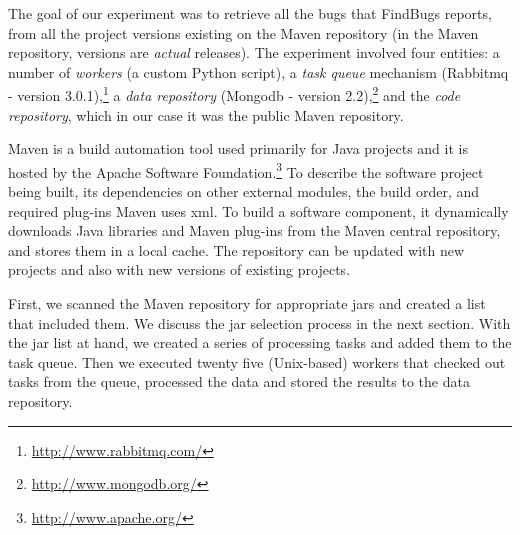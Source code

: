 \documentclass{sig-alternate}
\begin{document}
The goal of our experiment was to retrieve all the bugs that FindBugs reports,
from all the project versions existing on the Maven repository (in the Maven
repository, versions are {\it actual} releases). The experiment involved four entities:
a number of {\it workers} (a custom Python script), a {\it task queue}
mechanism (Rabbit{\sc mq} - version 3.0.1),\footnote{\url{http://www.rabbitmq.com/}}
a {\it data repository} (Mongo{\sc db} - version 2.2),\footnote{\url{http://www.mongodb.org/}}
and the {\it code repository}, which in our case it was
the public Maven repository.


Maven is a build automation tool used primarily for Java projects and it is
hosted by the Apache Software Foundation.\footnote{\url{http://www.apache.org/}}
To describe the software project being built, its dependencies
on other external modules, the build order, and required plug-ins Maven uses
{\sc xml}. To build a software component, it dynamically downloads Java libraries
and Maven plug-ins from the Maven central repository,
and stores them in a local cache. The repository can be updated with
new projects and also with new versions of existing projects.

First, we scanned the Maven repository for appropriate {\sc jar}s and created a
list that included them. We discuss the {\sc jar} selection process in the next 
section. With the {\sc jar} list at hand, we created a series of processing tasks
and added them to the task queue. Then we executed twenty five (Unix-based)
workers that checked out tasks from the queue, processed the data and stored the
results to the data repository.
\end{document}

